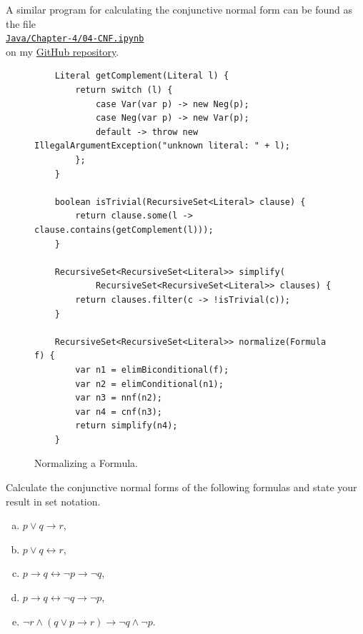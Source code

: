 A similar program for calculating the conjunctive normal form can be found as the file
\\[0.2cm]
\hspace*{1.3cm}
\href{https://github.com/karlstroetmann/Logic/blob/master/Java/Chapter-4/04-CNF.ipynb}{\texttt{Java/Chapter-4/04-CNF.ipynb}} 
\\[0.2cm]
on my \href{https://github.com/karlstroetmann/Logic}{GitHub repository}.


\begin{figure}[!ht]
  \centering
\begin{verbatim}
    Literal getComplement(Literal l) {
        return switch (l) {
            case Var(var p) -> new Neg(p);
            case Neg(var p) -> new Var(p);
            default -> throw new IllegalArgumentException("unknown literal: " + l);
        };
    }
    
    boolean isTrivial(RecursiveSet<Literal> clause) {
        return clause.some(l -> clause.contains(getComplement(l)));
    }
      
    RecursiveSet<RecursiveSet<Literal>> simplify(
            RecursiveSet<RecursiveSet<Literal>> clauses) {
        return clauses.filter(c -> !isTrivial(c));
    }                
  
    RecursiveSet<RecursiveSet<Literal>> normalize(Formula f) {
        var n1 = elimBiconditional(f);
        var n2 = elimConditional(n1);
        var n3 = nnf(n2);
        var n4 = cnf(n3);
        return simplify(n4);
    }
\end{verbatim} 
\vspace*{-0.3cm}
  \caption{Normalizing a Formula.}
  \label{fig:normalize}
\end{figure}
\pagebreak

\exerciseEng
Calculate the conjunctive normal forms of the following formulas and state your result in set notation.
\begin{enumerate}[(a)]
\item $p \vee q \rightarrow r$,
\item $p \vee q \leftrightarrow r$,
\item $p \rightarrow q \leftrightarrow \neg p \rightarrow \neg q$,
\item $p \rightarrow q \leftrightarrow \neg q \rightarrow \neg p$,
\item $\neg r \wedge (q \vee p \rightarrow r) \rightarrow \neg q \wedge \neg p$.
\end{enumerate}

